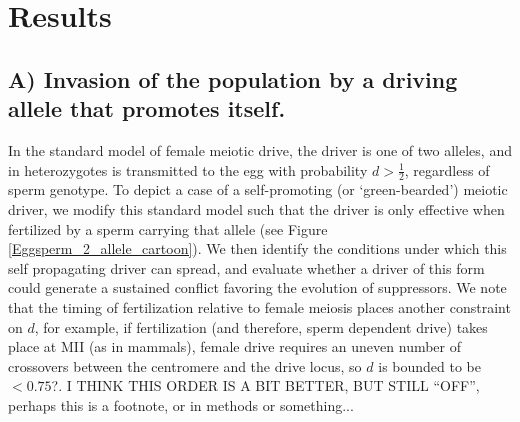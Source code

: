 \documentclass[12pt,letterpaper]{article}
\newcommand{\yb}[1]{{ \color{blue} #1}}
\begin{document}
\section*{Results}

\subsection*{ A) Invasion of the population by a driving allele that promotes
itself.}

In the standard model of female meiotic drive, \yb{the driver is one of two alleles, and in heterozygotes is transmitted to the egg} with probability  $d > \frac{1}{2}$, regardless of sperm genotype. 
To depict a case of a self-promoting (or `green-bearded') meiotic driver,  we modify this standard model such that the driver is only effective when fertilized by a sperm carrying that allele (see Figure \ref{Eggsperm_2_allele_cartoon}).
We then identify the conditions under which this self propagating driver can spread, and evaluate whether a driver of this form could 
	\yb{generate a sustained conflict favoring the evolution of suppressors}. 
We note that the timing of fertilization relative to female meiosis places another constraint on $d$, 
	for example, if fertilization (and therefore, sperm dependent drive) takes place at MII (as in mammals),
	female drive requires an uneven number of crossovers between the centromere and the drive locus, 
	so $d$ is bounded to be $<0.75$?.
\yb{I THINK THIS ORDER IS A BIT BETTER, BUT STILL ``OFF'', perhaps this is a footnote, or in methods or something...}




\end{document}

